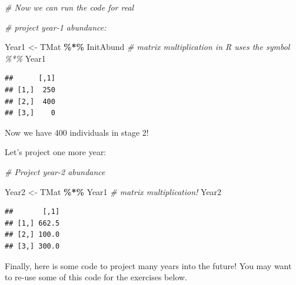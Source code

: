 \documentclass[
]{article}
\newenvironment{Shaded}{\begin{snugshade}}{\end{snugshade}}
\newcommand{\CommentTok}[1]{\textcolor[rgb]{0.56,0.35,0.01}{\textit{#1}}}
\newcommand{\NormalTok}[1]{#1}
\newcommand{\OtherTok}[1]{\textcolor[rgb]{0.56,0.35,0.01}{#1}}
\newcommand{\SpecialCharTok}[1]{\textcolor[rgb]{0.81,0.36,0.00}{\textbf{#1}}}
\begin{document}
\begin{Shaded}
\begin{Highlighting}[]
\CommentTok{\# Now we can run the code for real}

\CommentTok{\# project year{-}1 abundance:}

\NormalTok{Year1 }\OtherTok{\textless{}{-}}\NormalTok{ TMat }\SpecialCharTok{\%*\%}\NormalTok{ InitAbund  }\CommentTok{\# matrix multiplication in R uses the symbol \textquotesingle{}\%*\%\textquotesingle{}}
\NormalTok{Year1}
\end{Highlighting}
\end{Shaded}

\begin{verbatim}
##      [,1]
## [1,]  250
## [2,]  400
## [3,]    0
\end{verbatim}

Now we have 400 individuals in stage 2!

Let's project one more year:

\begin{Shaded}
\begin{Highlighting}[]
\CommentTok{\# Project year{-}2 abundance}

\NormalTok{Year2 }\OtherTok{\textless{}{-}}\NormalTok{ TMat }\SpecialCharTok{\%*\%}\NormalTok{ Year1  }\CommentTok{\# matrix multiplication!}
\NormalTok{Year2}
\end{Highlighting}
\end{Shaded}

\begin{verbatim}
##       [,1]
## [1,] 662.5
## [2,] 100.0
## [3,] 300.0
\end{verbatim}

Finally, here is some code to project many years into the future! You
may want to re-use some of this code for the exercises below.
\end{document}
